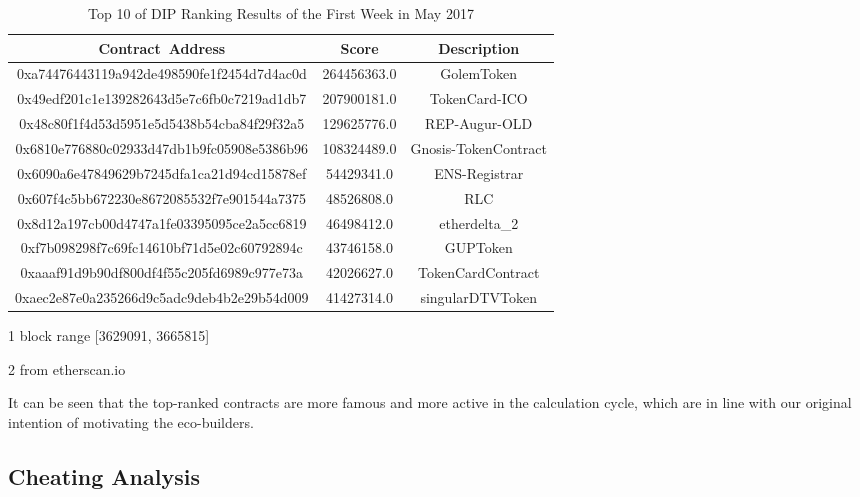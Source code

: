 \begin{table}[h]
\centering
\begin{threeparttable}[b]
\caption{Top 10 of DIP Ranking Results of the First Week in May 2017}
\label{table:dip}
\begin{tabular}{ccc} \toprule
    {Contract~Address} & {Score} & {Description\tnote{2}} \\ \midrule
0xa74476443119a942de498590fe1f2454d7d4ac0d & 264456363.0 & GolemToken \\
0x49edf201c1e139282643d5e7c6fb0c7219ad1db7 & 207900181.0 & TokenCard-ICO \\
0x48c80f1f4d53d5951e5d5438b54cba84f29f32a5 & 129625776.0 & REP-Augur-OLD \\
0x6810e776880c02933d47db1b9fc05908e5386b96 & 108324489.0 & Gnosis-TokenContract \\
0x6090a6e47849629b7245dfa1ca21d94cd15878ef & 54429341.0 & ENS-Registrar \\
0x607f4c5bb672230e8672085532f7e901544a7375 & 48526808.0 & RLC \\
0x8d12a197cb00d4747a1fe03395095ce2a5cc6819 & 46498412.0 & etherdelta\_2 \\
0xf7b098298f7c69fc14610bf71d5e02c60792894c & 43746158.0 & GUPToken \\
0xaaaf91d9b90df800df4f55c205fd6989c977e73a & 42026627.0 & TokenCardContract \\
0xaec2e87e0a235266d9c5adc9deb4b2e29b54d009 & 41427314.0 & singularDTVToken \\
\bottomrule                                                     
\end{tabular}	
\begin{tablenotes}
  \small
  \item[1] block range [3629091, 3665815]
  \item[2] from etherscan.io
\end{tablenotes}
\end{threeparttable}
\end{table}

It can be seen that the top-ranked contracts are more famous and more active in the calculation cycle, which are in line with our original intention of motivating the eco-builders.


\subsection{Cheating Analysis}
\label{dip:sybil}


